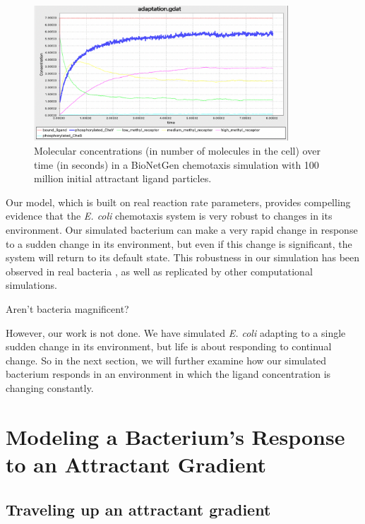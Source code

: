\begin{figure}[h]
\centering
\mySfFamily
\includegraphics[width = 0.85\textwidth]{../images/chemotaxis_tutorial_oneadd1e8.png}
\caption{Molecular concentrations (in number of molecules in the cell) over time (in seconds) in a BioNetGen chemotaxis simulation with 100 million initial attractant ligand particles.}
\label{fig:chemotaxis_tutorial_oneadd1e8}
\end{figure}

Our model, which is built on real reaction rate parameters, provides compelling evidence that the \textit{E. coli} chemotaxis system is very robust to changes in its environment. Our simulated bacterium can make a very rapid change in response to a sudden change in its environment, but even if this change is significant, the system will return to its default state. This robustness in our simulation has been observed in real bacteria , as well as replicated by other computational simulations.

Aren't bacteria magnificent?

However, our work is not done. We have simulated \textit{E. coli} adapting to a single sudden change in its environment, but life is about responding to continual change. So in the next section, we will further examine how our simulated bacterium responds in an environment in which the ligand concentration is changing constantly.\\


\FloatBarrier
{}

\section{Modeling a Bacterium's Response to an Attractant Gradient}
\label{sec:gradient}

\subsection{Traveling up an attractant gradient}

